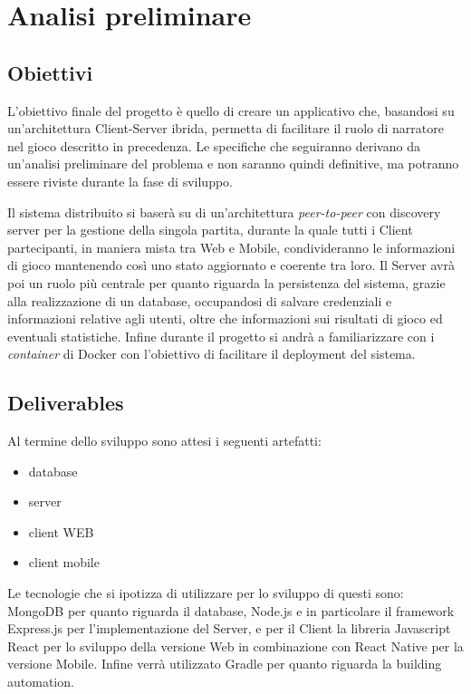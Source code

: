 \section{Analisi preliminare}

\subsection{Obiettivi}
L'obiettivo finale del progetto è quello di creare un applicativo che, basandosi su un'architettura Client-Server ibrida, permetta di facilitare il ruolo di narratore nel gioco descritto in precedenza.
Le specifiche che seguiranno derivano da un'analisi preliminare del problema e non saranno quindi definitive, ma potranno essere riviste durante la fase di sviluppo.

Il sistema distribuito si baserà su di un'architettura \emph{peer-to-peer} con discovery server per la gestione della singola partita, durante la quale tutti i Client partecipanti, in maniera mista tra Web e Mobile, condivideranno le informazioni di gioco mantenendo così uno stato aggiornato e coerente tra loro.
Il Server avrà poi un ruolo più centrale per quanto riguarda la persistenza del sistema, grazie alla realizzazione di un database, occupandosi di salvare credenziali e informazioni relative agli utenti, oltre che informazioni sui risultati di gioco ed eventuali statistiche. Infine durante il progetto si andrà a familiarizzare con i \emph{container} di Docker con l'obiettivo di facilitare il deployment del sistema. 

\subsection{Deliverables}
Al termine dello sviluppo sono attesi i seguenti artefatti:
\begin{itemize}
    \item database
    \item server
    \item client WEB
    \item client mobile
\end{itemize}
Le tecnologie che si ipotizza di utilizzare per lo sviluppo di questi sono: MongoDB per quanto riguarda il database, Node.js e in particolare il framework Express.js per l'implementazione del Server, e per  il Client la libreria Javascript React per lo sviluppo della versione Web in combinazione con React Native per la versione Mobile. Infine verrà utilizzato Gradle per quanto riguarda la building automation.

